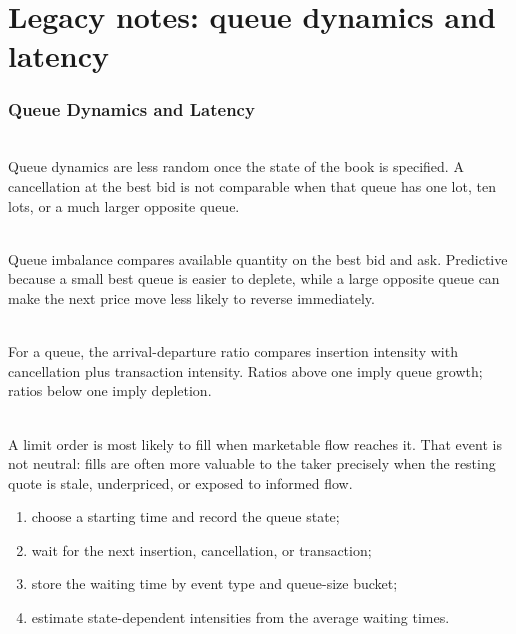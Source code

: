 \documentclass[a4paper,oneside,openany]{book}
\begin{document}
\chapter*{Legacy notes: queue dynamics and latency}

\subsection*{Queue Dynamics and Latency}

\begin{principle} \\
Queue dynamics are less random once the state of the book is specified. A cancellation at the best bid is not comparable when that queue has one lot, ten lots, or a much larger opposite queue.
\end{principle}

\begin{definition} \\
Queue imbalance compares available quantity on the best bid and ask. Predictive because a small best queue is easier to deplete, while a large opposite queue can make the next price move less likely to reverse immediately.
\end{definition}

\begin{mechanism} \\
For a queue, the arrival-departure ratio compares insertion intensity with cancellation plus transaction intensity. Ratios above one imply queue growth; ratios below one imply depletion.
\end{mechanism}

\begin{caveat} \\
A limit order is most likely to fill when marketable flow reaches it. That event is not neutral: fills are often more valuable to the taker precisely when the resting quote is stale, underpriced, or exposed to informed flow.
\end{caveat}

\begin{process} 
\begin{enumerate}[label=\roman*.]
\setlength{\itemsep}{0pt}
\item choose a starting time and record the queue state;
\item wait for the next insertion, cancellation, or transaction;
\item store the waiting time by event type and queue-size bucket;
\item estimate state-dependent intensities from the average waiting times.
\end{enumerate}
\end{process}
\end{document}
